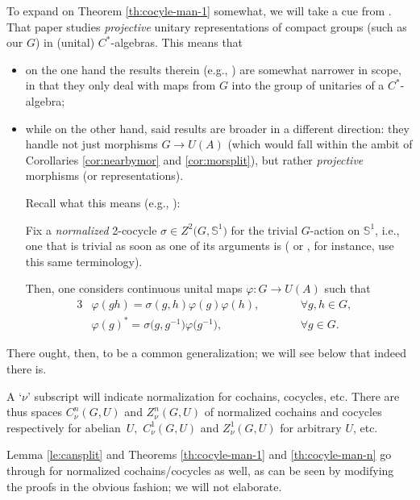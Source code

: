 \documentclass[10pt,a4paper]{amsart}
\numberwithin{equation}{section}
\newcommand\bS{{\mathbb S}}
\begin{document}
To expand on Theorem \ref{th:cocyle-man-1} somewhat, we will take a cue from \cite{mart-proj}. That paper studies {\it projective} unitary representations of compact groups (such as our $G$) in (unital) $C^*$-algebras. This means that
\begin{itemize}\itemsep=0pt
\item on the one hand the results therein (e.g., \cite[Proposition 1.7, 2.2 and 2.3]{mart-proj}) are somewhat narrower in scope, in that they only deal with maps from $G$ into the group of unitaries of a $C^*$-algebra;
\item while on the other hand, said results are broader in a different direction: they handle not just morphisms $G\to U(A)$ (which would fall within the ambit of Corollaries \ref{cor:nearbymor} and \ref{cor:morsplit}), but rather {\it projective} morphisms (or representations).

 Recall what this means (e.g., \cite[Section~1.4]{mart-proj}):

 Fix a {\it normalized} 2-cocycle $\sigma\in Z^2\big(G,\bS^1\big)$ for the trivial $G$-action on $\bS^1$, i.e., one that is trivial as soon as one of its arguments is (\cite[Section~III.1]{br-coh} or \cite[Section~2.3]{ev-coh}, for instance, use this same terminology).

 Then, one considers continuous unital maps $\varphi\colon G\to U(A)$ such that
 \begin{alignat*}{3}
 &\varphi(gh) = \sigma(g,h)\varphi(g)\varphi(h),\qquad &&\forall g,h\in G,&\\
 &\varphi(g)^*= \sigma\big(g,g^{-1}\big) \varphi\big(g^{-1}\big),\qquad &&\forall g\in G.&
 \end{alignat*}
\end{itemize}

There ought, then, to be a common generalization; we will see below that indeed there is.

\begin{Notation}\label{not:norm}
A `$\nu$' subscript will indicate normalization for cochains, cocycles, etc. There are thus spaces $C^n_{\nu}(G,U)$ and $Z^n_{\nu}(G,U)$ of normalized cochains and cocycles respectively for abelian~$U$,~$C^1_{\nu}(G,U)$ and $Z^1_{\nu}(G,U)$ for arbitrary $U$, etc.

Lemma \ref{le:cansplit} and Theorems \ref{th:cocyle-man-1} and \ref{th:cocyle-man-n} go through for normalized cochains/cocycles as well, as can be seen by modifying the proofs in the obvious fashion; we will not elaborate.
\end{Notation}
\end{document}
